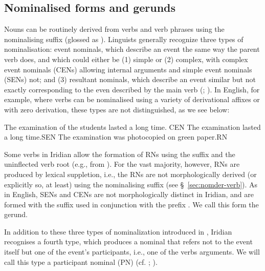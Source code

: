 \subsection{Nominalised forms and gerunds}\label{nom-morph}

Nouns can be routinely derived from verbs and verb phrases using the nominalising suffix  (glossed as \Nz{}). Linguists generally recognize three types of nominalisation: event nominals, which describe an event the same way the parent verb does, and which could either be (1) simple or (2) complex, with {\sc complex event nominals} (CENs) allowing internal arguments and {\sc simple event nominals} (SENs) not; and (3) {\sc resultant nominals}, which describe an event similar but not exactly corresponding to the even described by the main verb (\cite{grimshaw1990}; \cite{moulton2014}). In English, for example, where verbs can be nominalised using a variety of derivational affixes or with zero derivation, these types are not distinguished, as we see below:

\pex[interpartskip=0pt]
	\a The examination of the students lasted a long time. \hfill {CEN}
	\a The examination lasted a long time.\hfill {SEN}
	\a The examination was photocopied on green paper.\hfill {RN}\\
\xe

Some verbs in Iridian allow the formation of RNs using the suffix  and the uninflected verb root (e.g.,  from ). For the vast majority, however, RNs are produced by lexical suppletion, i.e., the RNs are not morphologically derived (or explicitly so, at least) using the nominalising suffix (see \S~\ref{sec:nomder-verb}). As in English, SENs and CENs are not morphologically distinct in Iridian, and are formed with the suffix  used in conjunction with the prefix . We call this form the {\sc gerund}.

In addition to these three types of nominalization introduced in \textcite{grimshaw1990}, Iridian recognises a fourth type, which produces a nominal that refers not to the event itself but one of the event's participants, i.e., one of the verbs arguments. We will call this type a {\sc participant nominal} (PN) (cf. \cite[400-5]{schackow2015}; \cite[297-8]{okuna}).


